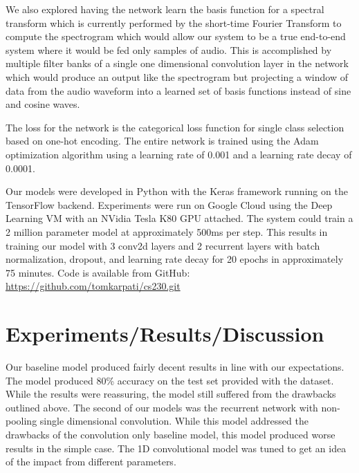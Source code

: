 \documentclass{article}
\begin{document}
We also explored having the network learn the basis function for a
spectral transform which is currently performed by the short-time
Fourier Transform to compute the spectrogram which would allow our
system to be a true end-to-end system where it would be fed only
samples of audio. This is accomplished by multiple filter banks of a
single one dimensional convolution
layer in the network which would produce an output like the
spectrogram but projecting a window of data from the audio waveform
into a learned set of basis functions instead of sine and cosine waves.

The loss for the network is the categorical loss function for single
class selection based on one-hot encoding. The entire network is
trained using the Adam optimization algorithm using a learning rate of
0.001 and a learning rate decay of 0.0001.

Our models were developed in Python with the Keras framework running
on the TensorFlow backend. Experiments were run on Google Cloud using
the Deep Learning VM with an NVidia Tesla K80 GPU attached. The system
could train a 2 million parameter model at approximately 500ms per
step. This results in training our model with 3 conv2d layers and 2
recurrent layers with batch normalization, dropout, and learning rate
decay for 20 epochs in approximately 75 minutes. Code is available
from GitHub: \url{https://github.com/tomkarpati/cs230.git}

\section{Experiments/Results/Discussion}
Our baseline model produced fairly decent results in line with our
expectations. The model produced 80\% accuracy on the test set
provided with the dataset. While the results were reassuring, the
model still suffered from the drawbacks outlined above. The second of
our models was the recurrent network with non-pooling single
dimensional convolution. While this model addressed the drawbacks of
the convolution only baseline model, this model produced worse results
in the simple case. The 1D convolutional model was tuned to get an
idea of the impact from different parameters.
\end{document}
